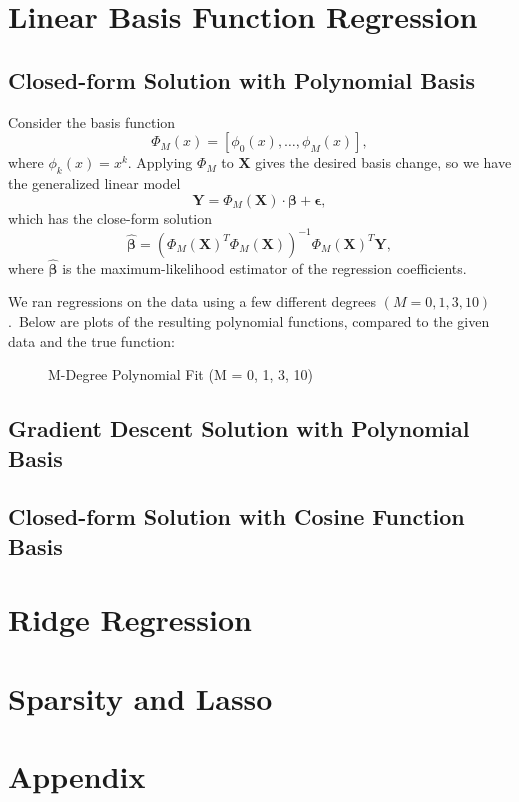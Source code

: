 \documentclass[journal]{IEEEtran}
\begin{document}
\section{Linear Basis Function Regression}

\subsection{Closed-form Solution with Polynomial Basis}

Consider the basis function $$\Phi_M(x) = [\phi_0(x), \dots, \phi_M(x)],$$ where $\phi_k(x) = x^k$. Applying $\Phi_M$ to $\mathbf{X}$ gives the desired basis change, so we have the generalized linear model $$\mathbf Y = \Phi_M(\mathbf X) \cdot \bm \beta + \bm \epsilon,$$ which has the close-form solution $$\hat{\bm \beta} = (\Phi_M(\mathbf X)^T \Phi_M(\mathbf X))^{-1} \Phi_M(\mathbf X)^T \mathbf Y,$$
where $\hat{\bm \beta}$ is the maximum-likelihood estimator of the regression coefficients.

We ran regressions on the data using a few different degrees $(M = 0, 1, 3, 10)$.\footnotemark\ Below are plots of the resulting polynomial functions, compared to the given data and the true function:


\begin{figure}[H]
  \centering
  \caption{M-Degree Polynomial Fit (M = 0, 1, 3, 10)}
\end{figure}


\subsection{Gradient Descent Solution with Polynomial Basis}

\subsection{Closed-form Solution with Cosine Function Basis}

\section{Ridge Regression}

\section{Sparsity and Lasso}

\section{Appendix}
\end{document}
